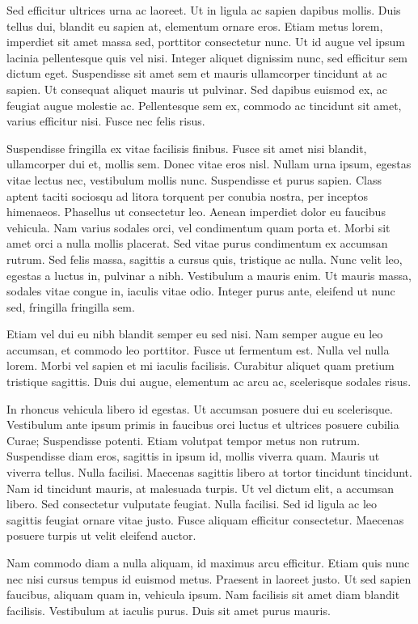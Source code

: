 Sed efficitur ultrices urna ac laoreet. Ut in ligula ac sapien dapibus mollis. Duis tellus dui, blandit eu sapien at, elementum ornare eros. Etiam metus lorem, imperdiet sit amet massa sed, porttitor consectetur nunc. Ut id augue vel ipsum lacinia pellentesque quis vel nisi. Integer aliquet dignissim nunc, sed efficitur sem dictum eget. Suspendisse sit amet sem et mauris ullamcorper tincidunt at ac sapien. Ut consequat aliquet mauris ut pulvinar. Sed dapibus euismod ex, ac feugiat augue molestie ac. Pellentesque sem ex, commodo ac tincidunt sit amet, varius efficitur nisi. Fusce nec felis risus.

Suspendisse fringilla ex vitae facilisis finibus. Fusce sit amet nisi blandit, ullamcorper dui et, mollis sem. Donec vitae eros nisl. Nullam urna ipsum, egestas vitae lectus nec, vestibulum mollis nunc. Suspendisse et purus sapien. Class aptent taciti sociosqu ad litora torquent per conubia nostra, per inceptos himenaeos. Phasellus ut consectetur leo. Aenean imperdiet dolor eu faucibus vehicula. Nam varius sodales orci, vel condimentum quam porta et. Morbi sit amet orci a nulla mollis placerat. Sed vitae purus condimentum ex accumsan rutrum. Sed felis massa, sagittis a cursus quis, tristique ac nulla. Nunc velit leo, egestas a luctus in, pulvinar a nibh. Vestibulum a mauris enim. Ut mauris massa, sodales vitae congue in, iaculis vitae odio. Integer purus ante, eleifend ut nunc sed, fringilla fringilla sem.

Etiam vel dui eu nibh blandit semper eu sed nisi. Nam semper augue eu leo accumsan, et commodo leo porttitor. Fusce ut fermentum est. Nulla vel nulla lorem. Morbi vel sapien et mi iaculis facilisis. Curabitur aliquet quam pretium tristique sagittis. Duis dui augue, elementum ac arcu ac, scelerisque sodales risus.

In rhoncus vehicula libero id egestas. Ut accumsan posuere dui eu scelerisque. Vestibulum ante ipsum primis in faucibus orci luctus et ultrices posuere cubilia Curae; Suspendisse potenti. Etiam volutpat tempor metus non rutrum. Suspendisse diam eros, sagittis in ipsum id, mollis viverra quam. Mauris ut viverra tellus. Nulla facilisi. Maecenas sagittis libero at tortor tincidunt tincidunt. Nam id tincidunt mauris, at malesuada turpis. Ut vel dictum elit, a accumsan libero. Sed consectetur vulputate feugiat. Nulla facilisi. Sed id ligula ac leo sagittis feugiat ornare vitae justo. Fusce aliquam efficitur consectetur. Maecenas posuere turpis ut velit eleifend auctor.

Nam commodo diam a nulla aliquam, id maximus arcu efficitur. Etiam quis nunc nec nisi cursus tempus id euismod metus. Praesent in laoreet justo. Ut sed sapien faucibus, aliquam quam in, vehicula ipsum. Nam facilisis sit amet diam blandit facilisis. Vestibulum at iaculis purus. Duis sit amet purus mauris.

